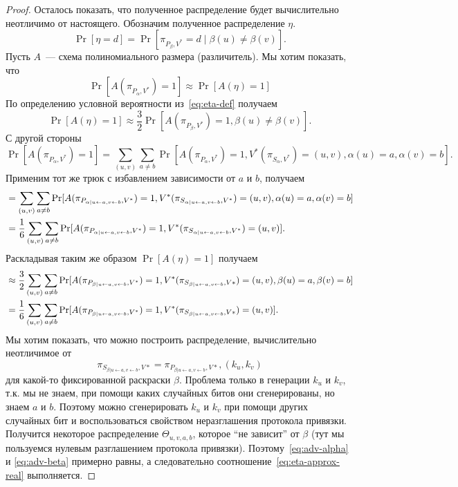 \documentclass[12pt,a4paper]{article}
\theoremstyle{definition}
\theoremstyle{plain}
\theoremstyle{remark}
\begin{document}
\begin{proof}
Осталось показать, что полученное распределение будет вычислительно неотличимо от настоящего.
Обозначим полученное распределение $\eta$.
\begin{equation}\label{eq:eta-def}
\Pr[\eta = d] = \Pr[\pi_{P_{\beta}, V^*} = d\mid 
\beta(u)\neq \beta(v)].
\end{equation}
Пусть $A$~--- схема полиномиального размера (различитель).
Мы хотим показать, что 
\begin{equation}\label{eq:eta-approx-real}
\Pr[A(\pi_{P_\alpha, V^*}) = 1] \approx \Pr[A(\eta) = 1]
\end{equation}
По определению условной вероятности из~\eqref{eq:eta-def} получаем
$$\Pr[A(\eta) = 1]\approx \frac32 \Pr[A(\pi_{P_{\beta}, V^*}) = 1, \beta(u)\neq \beta(v)].$$
С другой стороны
$$
\Pr[A(\pi_{P_\alpha, V^*}) = 1] = \sum_{(u,v)} \sum_{a\neq b} 
\Pr[A(\pi_{P_\alpha, V^*}) = 1, V^*(\pi_{S_\alpha, V^*}) = (u,v), \alpha(u) = a, \alpha(v) = b].
$$
Применим тот же трюк с избавлением зависимости от $a$ и $b$, получаем
\begin{align}\label{eq:adv-alpha}
&= \sum_{(u,v)} \sum_{a\neq b} 
\Pr[A(\pi_{P_{\alpha|u\gets a, v\gets b}, V^*}) = 1, V^*(\pi_{S_{\alpha|u\gets a, v\gets b}, V^*}) = (u,v), \alpha(u) = a, \alpha(v) = b] \notag\\ 
&= \frac{1}{6}\sum_{(u,v)} \sum_{a\neq b} 
\Pr[A(\pi_{P_{\alpha|u\gets a, v\gets b}, V^*}) = 1, V^*(\pi_{S_{\alpha|u\gets a, v\gets b}, V^*}) = (u,v)].
\end{align}
Раскладывая таким же образом $\Pr[A(\eta) = 1]$ получаем
\begin{align}\label{eq:adv-beta}
&\approx \frac{3}{2} \sum_{(u,v)} \sum_{a\neq b} 
\Pr[A(\pi_{P_{\beta|u\gets a, v\gets b}, V^*}) = 1,
 V^*(\pi_{S_{\beta|u\gets a, v\gets b}, V*}) = (u,v), \beta(u) = a, \beta(v) = b] \notag\\
&=\frac{1}{6} \sum_{(u,v)} \sum_{a\neq b} 
\Pr[A(\pi_{P_{\beta|u\gets a, v\gets b}, V^*}) = 1,
 V^*(\pi_{S_{\beta|u\gets a, v\gets b}, V*}) = (u,v)].
\end{align}
Мы хотим показать, что можно построить распределение, вычислительно неотличимое от 
$$\pi_{S_{\beta|u\gets a, v\gets b}, V*} = \pi_{P_{\beta|u\gets a, v\gets b}, V*}, (k_u, k_v)$$
для какой-то фиксированной раскраски $\beta$. Проблема только в генерации $k_u$ и $k_v$, т.к. мы не знаем, при помощи каких случайных битов они сгенерированы, но знаем $a$ и $b$. Поэтому можно сгенерировать $k_u$ и $k_v$ при помощи других случайных бит и воспользоваться свойством неразглашения протокола привязки. Получится некоторое распределение $\Theta_{u,v,a,b}$, которое ``не зависит'' от $\beta$ (тут мы пользуемся нулевым разглашением протокола привязки). Поэтому~\eqref{eq:adv-alpha} и
\eqref{eq:adv-beta} примерно равны, а следовательно соотношение~\eqref{eq:eta-approx-real} выполняется.
\end{proof}
\end{document}
